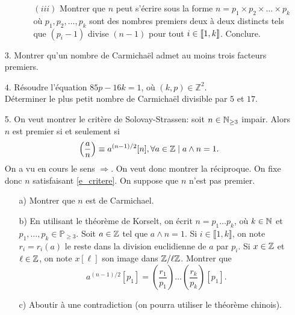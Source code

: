 \documentclass[11pt,a4paper]{article}
\begin{document}
\begin{itemize}
\begin{itemize}
\begin{itemize}
\item[$(iii)$] Montrer que $n$  peut s'écrire sous la forme $n = p_1 \times p_2 \times \ldots \times p_k$ où $p_1, p_2, \ldots, p_k$ sont des nombres premiers deux à deux distincts tels que $(p_i - 1)$ divise $(n - 1)$ pour tout $i \in \lb 1,k \rb $. Conclure.\\
\end{itemize}
\end{itemize}
\item[$3.$] Montrer qu'un nombre de Carmichaël admet au moins trois facteurs premiers.\\
\item[$4.$] Résoudre l'équation $85p - 16k = 1$, où $(k, p)\in \mathbb{Z}^2$.\\
Déterminer le plus petit nombre de Carmichaël divisible par $5$ et $17$.\\

\item[5.] On veut montrer le critère de Solovay-Strassen: soit $n\in \mathbb{N}_{\geq 3}$ impair. Alors $n$ est premier si et seulement si \begin{equation}\label{e_critere}
\left(\frac{a}{n}\right)\equiv a^{(n-1)/2} [n],\forall a\in \mathbb{Z}\mid a\wedge n =1.
\end{equation} On a vu en cours le sens $\Rightarrow$. On veut donc montrer la réciproque. On fixe donc $n$ satisfaisant \eqref{e_critere}. On suppose que $n$ n'est pas premier.

\begin{enumerate}
\item[ a)] Montrer que $n$ est de Carmichael.

\item[ b)] En utilisant le théorème de Korselt, on écrit $n=p_1\ldots p_k$, où $k\in \mathbb{N}$ et  $p_1,\ldots,p_k\in \mathbb{P}_{\geq 3}$.  Soit $a\in \mathbb{Z}$ tel que $a\wedge n=1$. Si $i\in \llbracket 1,k\rrbracket$, on note $r_i=r_i(a)$ le reste dans la division euclidienne de $a$ par $p_i$. Si $x\in \mathbb{Z}$ et $\ell\in \mathbb{Z}$, on note $x[\ell]$ son image dans $\mathbb{Z}/\ell\mathbb{Z}$.  Montrer que \begin{equation}\label{e_rel}
a^{(n-1)/2}[p_1]=\left(\frac{r_1}{p_1}\right)\ldots \left(\frac{r_k}{p_k}\right)[p_1].
\end{equation}

\item[c)] Aboutir à une contradiction (on pourra utiliser le théorème chinois).
















\end{enumerate}


\end{itemize}
\end{document}
